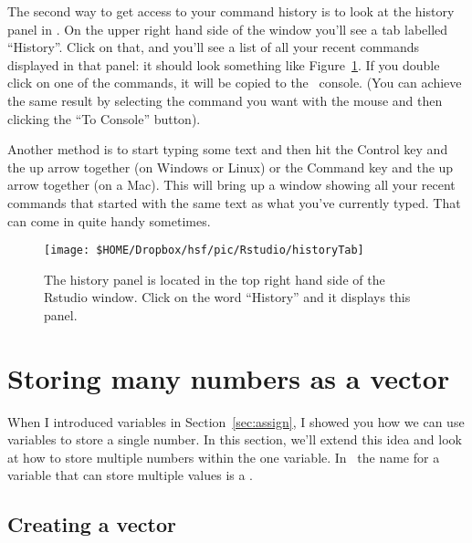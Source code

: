 The second way to get access to your command history is to look at the history panel in \Rstudio. On the upper right hand side of the \Rstudio window you'll see a tab labelled ``History''. Click on that, and you'll see a list of all your recent commands displayed in that panel: it should look something like Figure~\ref{fig:Rstudiohistory}. If you double click on one of the commands, it will be copied to the \R\ console. (You can achieve the same result by selecting the command you want with the mouse and then clicking the ``To Console'' button). 

Another method is to start typing some text and then hit the Control key and the up arrow together (on Windows or Linux) or the Command key and the up arrow together (on a Mac). This will bring up a window showing all your recent commands that started with the same text as what you've currently typed. That can come in quite handy sometimes.

\begin{figure}[t]
\begin{center}
		\texttt{[image: \$HOME/Dropbox/hsf/pic/Rstudio/historyTab]}
\caption{The history panel is located in the top right hand side of the Rstudio window. Click on the word ``History'' and it displays this panel.  }
\label{fig:Rstudiohistory}
\end{center}
\end{figure}



\section{Storing many numbers as a vector~\label{sec:vectors}}

When I introduced variables in Section~\ref{sec:assign}, I showed you how we can use variables to store a single number. In this section, we'll extend this idea and look at how to store multiple numbers within the one variable. In \R\, the name for a variable that can store multiple values is a . 

\subsection{Creating a vector}

